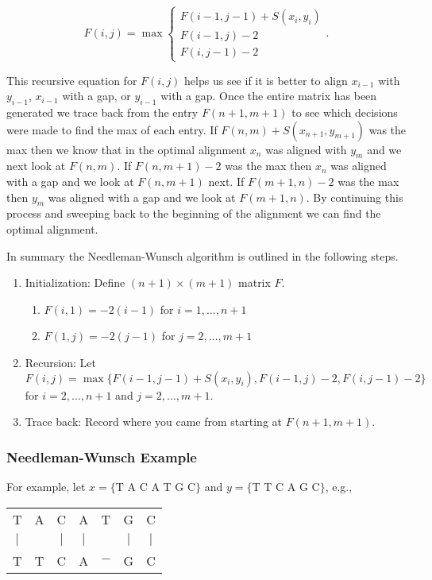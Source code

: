\documentclass{article}
\numberwithin{equation}{section}
\begin{document}
\[
F(i,j)=\max\left\{
\begin{array}{l}\label{recursion1}
F(i-1,j-1)+S(x_i,y_i) \nonumber \\
F(i-1,j)-2 \\
F(i,j-1)-2 \nonumber
\end{array}
\right. .
\]

This recursive equation for $F(i,j)$ helps us see if it is better to
align $x_{i-1}$ with $y_{i-1}$, $x_{i-1}$ with a gap, or $y_{i-1}$
with a gap.  Once the entire matrix has been generated we trace back
from the entry $F(n+1,m+1)$ to see which decisions were made to find
the max of each entry.  If $F(n,m)+S(x_{n+1},y_{m+1})$ was the max
then we know that in the optimal alignment $x_n$ was aligned with
$y_m$ and we next look at $F(n,m)$.   If $F(n,m+1)-2$ was the max
then $x_n$ was aligned with a gap and we look at $F(n,m+1)$ next. If
$F(m+1,n)-2$ was the max then $y_m$ was aligned with a gap and we
look at $F(m+1,n)$.  By continuing this process and sweeping back to
the beginning of the alignment we can find the optimal alignment.

In summary the Needleman-Wunsch algorithm is outlined in the
following steps.

\begin{enumerate}
\item Initialization: Define $(n+1)\times(m+1)$ matrix $F$.
    \begin{enumerate}
    \item $F(i,1)=-2(i-1)$ for $i=1,\ldots,n+1$
    \item $F(1,j)=-2(j-1)$ for $j=2,\ldots,m+1$
    \end{enumerate}
\item Recursion: Let
$F(i,j)=\max\{F(i-1,j-1)+S(x_i,y_i),F(i-1,j)-2,F(i,j-1)-2\}$ for
$i=2,\ldots,n+1$ and $j=2,\ldots,m+1$.
\item Trace back: Record where you came from starting at
$F(n+1,m+1)$.
\end{enumerate}


\subsubsection{Needleman-Wunsch Example}
For example, let $x=\{\textrm{T A C A T G C}\}$ and $y=\{\textrm{T T C A G C}\}$, e.g.,
\begin{center}
\begin{tabular}{ccccccc}
T & A & C &  A &  T &  G & C \\
$\mid$ &  & $\mid$ & $\mid$ & & $\mid$ & $\mid$\\
T & T & C & A & $-$ & G & C \\
\end{tabular}
\end{center}
\end{document}
